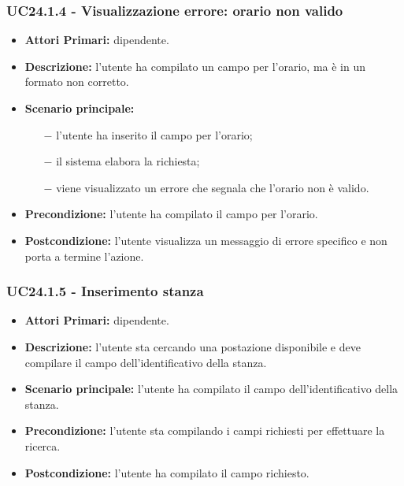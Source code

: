 \subsubsection{ UC24.1.4 - Visualizzazione errore: orario non valido }
\begin{itemize}
	\item\textbf{Attori Primari:} dipendente.
	\item\textbf{Descrizione:} l’utente ha compilato un campo per l'orario, ma è in un formato non corretto.
	\item\textbf{Scenario principale:} 
	\begin{itemize}
		\item[$-$] l’utente ha inserito il campo per l'orario;
		\item[$-$] il sistema elabora la richiesta;
		\item[$-$] viene visualizzato un errore che segnala che l'orario non è valido.
	\end{itemize}
	\item\textbf{Precondizione:} l’utente ha compilato il campo per l'orario.
	\item\textbf{Postcondizione:} l’utente visualizza un messaggio di errore specifico e non porta a termine l’azione.
\end{itemize}
\subsubsection{ UC24.1.5 - Inserimento stanza }
\begin{itemize}
	\item\textbf{Attori Primari:} dipendente.
	\item\textbf{Descrizione:} l’utente sta cercando una postazione disponibile e deve compilare il campo dell'identificativo della stanza.
	\item\textbf{Scenario principale:} l’utente ha compilato il campo dell'identificativo della stanza.
	\item\textbf{Precondizione:} l’utente sta compilando i campi richiesti per effettuare la ricerca.
	\item\textbf{Postcondizione:} l’utente ha compilato il campo richiesto.
\end{itemize}

